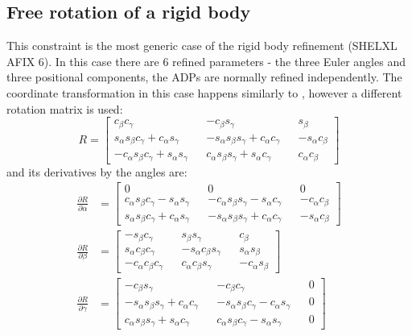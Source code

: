 \documentclass[pdf]{iucr}
\newcommand{\partialder}[2]{\frac{\partial #1}{\partial #2}}
\begin{document}
\subsection{Free rotation of a rigid body}
\label{sec:free:rotated:group}
This constraint is the most generic case of the rigid body refinement (SHELXL AFIX 6). In this case there are 6 refined parameters - the three Euler angles and three positional components, the ADPs are normally refined independently. The coordinate transformation in this case happens similarly to , however a different rotation matrix is used:
\begin{equation}
R = \begin{bmatrix} \label{eq:erm}
   c_\beta c_\gamma && - c_\beta s_\gamma &&  s_\beta \\
   s_\alpha s_\beta c_\gamma +  c_\alpha s_\gamma && - s_\alpha s_\beta s_\gamma+ c_\alpha c_\gamma && - s_\alpha c_\beta \\
  - c_\alpha s_\beta c_\gamma+ s_\alpha s_\gamma &&  c_\alpha s_\beta s_\gamma+ s_\alpha c_\gamma &&  c_\alpha c_\beta
\end{bmatrix}
\end{equation}
and its derivatives by the angles are:
\begin{align}
\partialder{R}{\alpha} &= \begin{bmatrix}
  0 && 0 && 0 \\
   c_\alpha s_\beta c_\gamma -  s_\alpha s_\gamma && - c_\alpha s_\beta s_\gamma- s_\alpha c_\gamma && - c_\alpha c_\beta \\
   s_\alpha s_\beta c_\gamma+ c_\alpha s_\gamma && - s_\alpha s_\beta s_\gamma+ c_\alpha c_\gamma && - s_\alpha c_\beta
\end{bmatrix}
\\
\partialder{R}{\beta} &= \begin{bmatrix}
  - s_\beta c_\gamma &&  s_\beta s_\gamma &&  c_\beta \\
   s_\alpha c_\beta c_\gamma && - s_\alpha c_\beta s_\gamma &&  s_\alpha s_\beta \\
  - c_\alpha c_\beta c_\gamma &&  c_\alpha c_\beta s_\gamma && - c_\alpha s_\beta
\end{bmatrix}
\\
\partialder{R}{\gamma} &= \begin{bmatrix}
  - c_\beta s_\gamma && - c_\beta c_\gamma && 0 \\
  - s_\alpha s_\beta s_\gamma +  c_\alpha c_\gamma && - s_\alpha s_\beta c_\gamma- c_\alpha s_\gamma && 0 \\
   c_\alpha s_\beta s_\gamma+ s_\alpha c_\gamma &&  c_\alpha s_\beta c_\gamma- s_\alpha s_\gamma && 0
\end{bmatrix}
\end{align}
\end{document}
